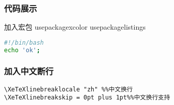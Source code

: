\subsubsection{代码展示}
加入宏包
usepackage{xcolor}%
usepackage{listings}%
\begin{lstlisting}[language=bash]
#!/bin/bash
echo 'ok';
\end{lstlisting}
\subsubsection{加入中文断行}
\begin{lstlisting}[language=Tex]
\XeTeXlinebreaklocale "zh" %%中文换行
\XeTeXlinebreakskip = 0pt plus 1pt%%中文换行支持
\end{lstlisting}





